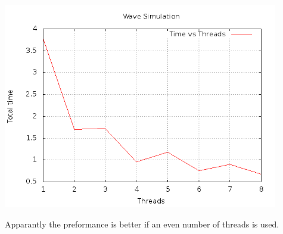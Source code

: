 \documentclass[a4paper]{article}
\begin{document}
    \begin{center}
      \includegraphics[width=0.9\textwidth]{speedplot.png}
    \end{center}
    Apparantly the preformance is better if an even number of threads is used.
\end{document}
